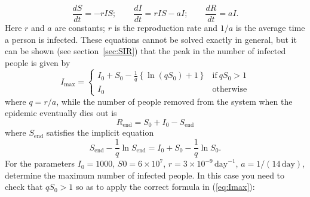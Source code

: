 \begin{equation}
\frac{d S}{d t} = -r I S ; \qquad \frac{d I}{d t} = r I S - a I ; \qquad \frac{d R}{d t} = a I .
\end{equation}
Here $r$ and $a$ are constants; $r$ is the reproduction rate and $1/a$ is the average time a person
is infected.
These equations cannot be solved exactly in general, but it can be shown
(see section~\ref{sec:SIR}) that the peak in the number of infected people is
given by
\begin{equation}
\label{eq:Imax}
I_\mathrm{max} =
\left\{
\begin{array}{ll}
I_0 + S_0 - \frac{1}{q} \left\{\ln (q S_0) + 1 \right\} & \mathrm{if\ }qS_0 > 1 \\
I_0                                                     & \mathrm{otherwise}
\end{array}
\right.
\end{equation}
where $q = r/a$, 
while the number of people removed from the system when the epidemic eventually dies out
is
\begin{equation}
\label{eq:Rend}
R_\mathrm{end} = S_0 + I_0 - S_\mathrm{end}
\end{equation}
where $S_\mathrm{end} $ satisfies the implicit equation
\begin{equation}
\label{eq:Send}
S_\mathrm{end} - \frac{1}{q} \ln S_\mathrm{end} = I_0 + S_0 -\frac{1}{q} \ln S_0 .
\end{equation}
For the parameters $I_0 = 1000$, $S0 = 6 \times 10^7$, $r = 3 \times 10^{-9} \, \mathrm{day}^{-1}$,
$a = 1/(14 \, \mathrm{day})$, determine the maximum number of infected people. 
In this case you need to check that $qS_0>1$ so as to apply the correct formula in
(\ref{eq:Imax}):



